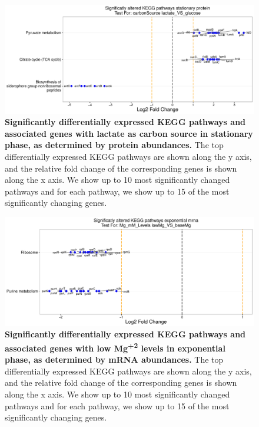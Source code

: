 \documentclass[a4paper]{article}
\begin{document}
\clearpage
\begin{figure}
	\includegraphics[width=1.0\textwidth]{../../d_figures/kegg_08.pdf}
	\caption[Significantly altered KEGG pathways for protein samples in stationary phase tested for lactate against glucose]
	{\textbf{Significantly differentially expressed KEGG pathways and associated genes with lactate as carbon source in stationary phase, as determined by protein abundances.} The top differentially expressed KEGG pathways are shown along the y axis, and the relative fold change of the corresponding genes is shown along the x axis. We show up to 10 most significantly changed pathways and for each pathway, we show up to 15 of the most significantly changing genes.}
\end{figure}

\clearpage
\begin{figure}
	\includegraphics[width=1.0\textwidth]{../../d_figures/kegg_09.pdf}
	\caption[Significantly altered KEGG pathways for mRNA samples in exponential phase tested for low Mg\textsuperscript{+2} levels against base Mg\textsuperscript{+2}]
	{\textbf{Significantly differentially expressed KEGG pathways and associated genes with low Mg\textsuperscript{+2} levels in exponential phase, as determined by mRNA abundances.} The top differentially expressed KEGG pathways are shown along the y axis, and the relative fold change of the corresponding genes is shown along the x axis. We show up to 10 most significantly changed pathways and for each pathway, we show up to 15 of the most significantly changing genes.}
\end{figure}
\end{document}
